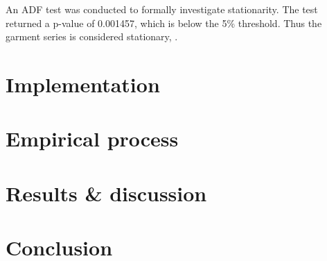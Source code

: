 \documentclass[conference]{IEEEtran}
\begin{document}
An ADF test was conducted to formally investigate stationarity. The test returned a p-value of 0.001457, which is below the 5\% threshold. Thus the garment series is considered stationary, \cite{garment_productivty}.

\section{\textbf{Implementation}}

\section{\textbf{Empirical process}}

\section{\textbf{Results \& discussion}}

\section{\textbf{Conclusion}}



\vspace{12pt}
\end{document}
